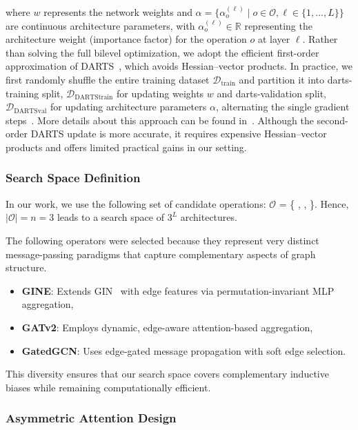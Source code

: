 \documentclass[lettersize,journal]{IEEEtran}
\begin{document}
where $w$ represents the network weights and $\alpha = \{\alpha_o^{(\ell)} \mid o \in \mathcal{O}, \ell \in \{1, ..., L\}\}$ are continuous architecture parameters, with $\alpha_o^{(\ell)} \in \mathbb{R}$ representing the architecture weight (importance factor) for the operation $o$ at layer $\ell$.
Rather than solving the full bilevel optimization, we adopt the efficient first-order approximation of DARTS~\cite{liu_darts_2019}, which avoids Hessian–vector products. 
In practice, we first randomly shuffle the entire training dataset $\mathcal{D}_{\text{train}}$ and partition it into darts-training split, $\mathcal{D}_{\text{DARTStrain}}$ for updating weights $w$ and darts-validation split, $\mathcal{D}_{\text{DARTSval}}$ for updating architecture parameters $\alpha$, alternating the single gradient steps~\cite{liu_darts_2019}. More details about this approach can be found in~\cite{liu_darts_2019}.  Although the second-order DARTS update is more accurate, it requires expensive Hessian–vector products and offers limited practical gains in our setting.

\subsubsection{Search Space Definition}
In our work, we use the following set of candidate operations:
$\mathcal{O}$ = \{ \cite{wang_equivariant_2022},  \cite{brody_how_2022},  \cite{bresson_residual_2018}\}. Hence, $|\mathcal{O}| = n=3$ leads to a search space of $3^L$ architectures.

The following operators were selected because they represent very distinct message-passing paradigms that capture complementary aspects of graph structure.
\begin{itemize}
    \item \textbf{GINE}: Extends GIN~\cite{xu_how_2019} with edge features via permutation-invariant MLP aggregation,
    \item \textbf{GATv2}: Employs dynamic, edge-aware attention-based aggregation,
    \item \textbf{GatedGCN}: Uses edge-gated message propagation with soft edge selection. 
\end{itemize}
This diversity ensures that our search space covers complementary inductive biases while remaining computationally efficient.

\subsubsection{Asymmetric Attention Design}
\end{document}
